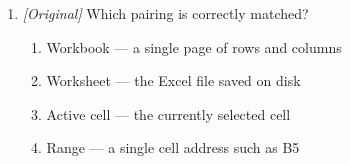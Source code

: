 \begin{enumerate}[label=\textbf{Q\arabic*.}, leftmargin=*]
\begin{enumerate}[label=\Alph*.]
    \item 12
    \item 20
    \item 100
  \end{enumerate}
\item \textit{[Original]} Which pairing is correctly matched?
  \begin{enumerate}[label=\Alph*.]
    \item Workbook --- a single page of rows and columns
    \item Worksheet --- the Excel file saved on disk
    \item Active cell --- the currently selected cell
    \item Range --- a single cell address such as B5
  \end{enumerate}


\end{enumerate}
